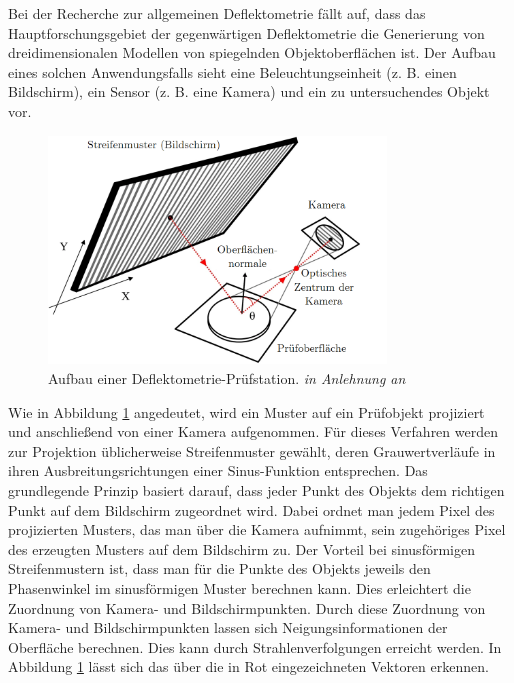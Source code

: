 Bei der Recherche zur allgemeinen Deflektometrie fällt auf, dass das Hauptforschungsgebiet der gegenwärtigen Deflektometrie die Generierung von dreidimensionalen Modellen von spiegelnden Objektoberflächen ist.
Der Aufbau eines solchen Anwendungsfalls sieht eine Beleuchtungseinheit (z. B. einen Bildschirm), ein Sensor (z. B. eine Kamera) und ein zu untersuchendes Objekt vor.

\begin{figure}[H]
	\centering
	\includegraphics[width=0.8\textwidth]{01_einfuehrung/deflektometrie/rekonstruktion/figures/nature-articel-nr1}
	\caption[Aufbau einer Deflektometrie-Prüfstation]{Aufbau einer Deflektometrie-Prüfstation. \textit{in Anlehnung an} \cite{aufbau}}
	\label{img:aufbau}
\end{figure}

\noindent
Wie in Abbildung \ref{img:aufbau} angedeutet, wird ein Muster auf ein Prüfobjekt projiziert und anschließend von einer Kamera aufgenommen.
Für dieses Verfahren werden zur Projektion üblicherweise Streifenmuster ge\-wählt, deren Grauwertverläufe in ihren Ausbreitungsrichtungen einer Sinus-Funktion entsprechen.
Das grundlegende Prinzip basiert darauf, dass jeder Punkt des Objekts dem richtigen Punkt auf dem Bildschirm zugeordnet wird.
Dabei ordnet man jedem Pixel des projizierten Musters, das man über die Kamera aufnimmt, sein zugehöriges Pixel des erzeugten Musters auf dem Bildschirm zu.
Der Vorteil bei sinusförmigen Streifenmustern ist, dass man für die Punkte des Objekts jeweils den Phasenwinkel im sinusförmigen Muster berechnen kann.
Dies erleichtert die Zuordnung von Kamera- und Bildschirmpunkten.
Durch diese Zuordnung von Kamera- und Bildschirmpunkten lassen sich Neigungsinformationen der Oberfläche berechnen.
Dies kann durch Strahlenverfolgungen erreicht werden.
In Abbildung \ref{img:aufbau} lässt sich das über die in Rot eingezeichneten Vektoren erkennen.

